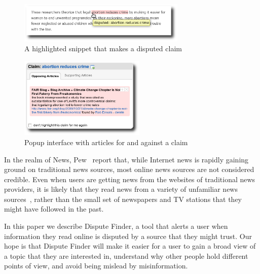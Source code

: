 \documentclass{www2010-submission}
\newcommand{\todo}[1]{}
\begin{document}
\begin{figure}[tb]
	\begin{center}
	\includegraphics[width=8cm]{pictures/highlight_abortion.png}
	\caption{A highlighted snippet that makes a disputed claim}
	\label{highlight}
	\end{center}
\end{figure}

\begin{figure}[tb]
	\begin{center}
	\includegraphics[width=6cm]{pictures/popup_abortion_shadow.png}
	\caption{Popup interface with articles for and against a claim}
	\label{claimview}
	\end{center}
\end{figure}
\todo{Popup interface should contain a "don't mark this" button}

\todo{More screenshots/graphs/visual information}

In the realm of News, Pew~\cite{pew-news} report that, while Internet news is rapidly gaining ground on traditional news sources, most online news sources are not considered credible. Even when users are getting news from the websites of traditional news providers, it is likely that they read news from a variety of unfamiliar news sources~\cite{pew-news}, rather than the small set of newspapers and TV stations that they might have followed in the past.

\todo{word this better}\todo{update all screenshots}

In this paper we describe Dispute Finder, a tool that alerts a user when information they read online is disputed by a source that they might trust. Our hope is that Dispute Finder will make it easier for a user to gain a broad view of a topic that they are interested in, understand why other people hold different points of view, and avoid being mislead by misinformation.
\end{document}
